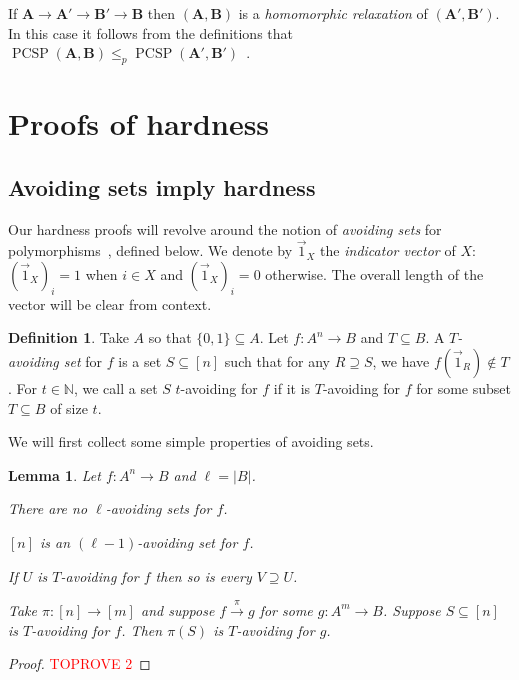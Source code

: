 \documentclass[a4paper,11pt]{article}
\newcommand{\2}{\vec{2}}
\newcommand{\1}{\vec{1}}
\newcommand{\0}{\vec{0}}
\renewcommand{\A}{\ensuremath{\mathbf{A}}}
\newcommand{\B}{\ensuremath{\mathbf{B}}}
\DeclareMathOperator{\PCSP}{PCSP}
\theoremstyle{plain}
\newtheorem{lemma}[theorem]{Lemma}
\theoremstyle{definition}
\newtheorem{definition}[theorem]{Definition}
\begin{document}
If $\A\to\A'\to\B'\to\B$ then $(\A,\B)$ is a \emph{homomorphic relaxation} of $(\A',\B')$. In this case it follows from the definitions that  $\PCSP(\A,\B)\leq_p\PCSP(\A',\B')$~\cite{BBKO21}.









 
\section{Proofs of hardness}
\subsection{Avoiding sets imply hardness}
\label{sec:avoiding}

Our hardness proofs will revolve around the notion of \emph{avoiding sets} for
polymorphisms~\cite{BBKO21}, defined below. We denote by $\1_X$ the
\emph{indicator vector} of $X$: $(\1_X)_i = 1$ when $i \in X$ and $(\1_X)_i = 0$ otherwise. The overall length of the vector will be clear from context.

\begin{definition}
Take $A$ so that $\{0, 1 \} \subseteq A$. Let $f:A^n\to B$ and $T\subseteq B$.
  A \emph{$T$-avoiding set} for $f$ is a set $S \subseteq [n]$ such that for any
  $R \supseteq S$, we have
  $f(\1_R) \notin T$.
  For $t\in
\mathbb{N}$, we call a set $S$ $t$-avoiding for $f$ if it is $T$-avoiding for
$f$ for some subset $T\subseteq B$ of size $t$. 
\end{definition}

We will first collect some simple properties of avoiding sets.
\begin{lemma}\label{lem:avoidingProperties}
    Let $f : A^n \to B$ and $\ell = |B|$.
    \begin{lemenumerate}
        \item\label{item:noLAvoiding} There are no $\ell$-avoiding sets for $f$.
        \item\label{item:domainAvoiding} $[n]$ is an $(\ell - 1)$-avoiding set for $f$.
        \item\label{item:upwardsClosed} If $U$ is $T$-avoiding for $f$ then so is every $V\supseteq U$.
        \item\label{item:minorPreserving} Take $\pi : [n] \to [m]$ and suppose $f \xrightarrow{\pi} g$ for some $g : A^m \to B$. Suppose $S \subseteq [n]$ is $T$-avoiding for $f$. Then $\pi(S)$ is $T$-avoiding for $g$.
    \end{lemenumerate}
\end{lemma}
\begin{proof}\textcolor{red}{TOPROVE 2}\end{proof}
\end{document}
